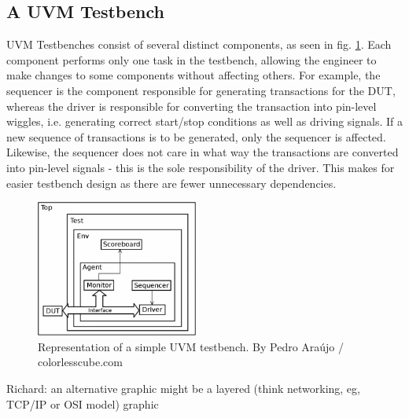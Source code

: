 \documentclass[a4paper, conference]{IEEEtran}
\newcommand{\ducky}[1]{{\color{orange} Richard: #1}}
\begin{document}
\subsection{A UVM Testbench}
UVM Testbenches consist of several distinct components, as seen in fig. \ref{fig:uvm_testbench}. Each component performs only one task in the testbench, allowing the engineer to make changes to some components without affecting others. 
For example, the sequencer is the component responsible for generating transactions for the DUT, whereas the driver is responsible for converting the transaction into pin-level wiggles, i.e. generating correct start/stop conditions as well as driving signals. If a new sequence of transactions is to be generated, only the sequencer is affected. Likewise, the sequencer does not care in what way the transactions are converted into pin-level signals - this is the sole responsibility of the driver. This makes for easier testbench design as there are fewer unnecessary dependencies. 

\begin{figure}
    \centering
    \includegraphics[width=0.475\textwidth]{uvm-tb_Pedro-Araujo.png}
    \caption{Representation of a simple UVM testbench. By Pedro Araújo / colorlesscube.com}
    \label{fig:uvm_testbench}
\end{figure}

\ducky{an alternative graphic might be a layered (think networking, eg, TCP/IP or OSI model) graphic}
\end{document}
